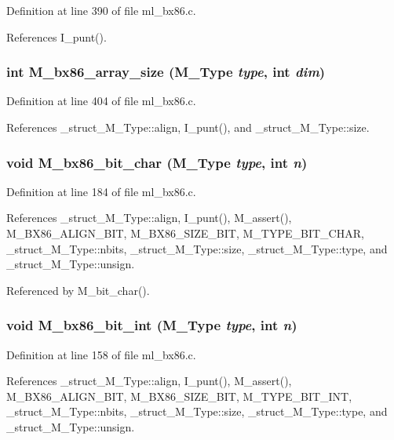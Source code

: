 Definition at line 390 of file ml\_\-bx86.c.

References I\_\-punt().
\subsubsection{\setlength{\rightskip}{0pt plus 5cm}int M\_\-bx86\_\-array\_\-size (\bf{M\_\-Type} {\em type}, int {\em dim})}\label{ml__bx86_8c_d924dce73427324c7631f1d80b2b41f8}




Definition at line 404 of file ml\_\-bx86.c.

References \_\-struct\_\-M\_\-Type::align, I\_\-punt(), and \_\-struct\_\-M\_\-Type::size.
\subsubsection{\setlength{\rightskip}{0pt plus 5cm}void M\_\-bx86\_\-bit\_\-char (\bf{M\_\-Type} {\em type}, int {\em n})}\label{ml__bx86_8c_21db3f6d223d47a124a35b399acee32e}




Definition at line 184 of file ml\_\-bx86.c.

References \_\-struct\_\-M\_\-Type::align, I\_\-punt(), M\_\-assert(), M\_\-BX86\_\-ALIGN\_\-BIT, M\_\-BX86\_\-SIZE\_\-BIT, M\_\-TYPE\_\-BIT\_\-CHAR, \_\-struct\_\-M\_\-Type::nbits, \_\-struct\_\-M\_\-Type::size, \_\-struct\_\-M\_\-Type::type, and \_\-struct\_\-M\_\-Type::unsign.

Referenced by M\_\-bit\_\-char().
\subsubsection{\setlength{\rightskip}{0pt plus 5cm}void M\_\-bx86\_\-bit\_\-int (\bf{M\_\-Type} {\em type}, int {\em n})}\label{ml__bx86_8c_220e0e699bca85da464e4279dc2fcaa9}




Definition at line 158 of file ml\_\-bx86.c.

References \_\-struct\_\-M\_\-Type::align, I\_\-punt(), M\_\-assert(), M\_\-BX86\_\-ALIGN\_\-BIT, M\_\-BX86\_\-SIZE\_\-BIT, M\_\-TYPE\_\-BIT\_\-INT, \_\-struct\_\-M\_\-Type::nbits, \_\-struct\_\-M\_\-Type::size, \_\-struct\_\-M\_\-Type::type, and \_\-struct\_\-M\_\-Type::unsign.

